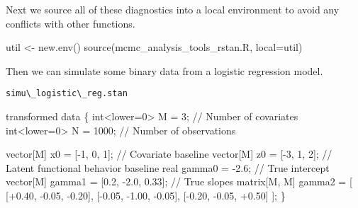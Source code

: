 \documentclass[
  letterpaper,
  DIV=11,
  numbers=noendperiod]{scrartcl}
\newenvironment{Shaded}{\begin{snugshade}}{\end{snugshade}}
\newcommand{\AttributeTok}[1]{\textcolor[rgb]{0.40,0.45,0.13}{#1}}
\newcommand{\CommentTok}[1]{\textcolor[rgb]{0.37,0.37,0.37}{#1}}
\newcommand{\DataTypeTok}[1]{\textcolor[rgb]{0.68,0.00,0.00}{#1}}
\newcommand{\DecValTok}[1]{\textcolor[rgb]{0.68,0.00,0.00}{#1}}
\newcommand{\FloatTok}[1]{\textcolor[rgb]{0.68,0.00,0.00}{#1}}
\newcommand{\FunctionTok}[1]{\textcolor[rgb]{0.28,0.35,0.67}{#1}}
\newcommand{\KeywordTok}[1]{\textcolor[rgb]{0.00,0.23,0.31}{#1}}
\newcommand{\NormalTok}[1]{\textcolor[rgb]{0.00,0.23,0.31}{#1}}
\newcommand{\OtherTok}[1]{\textcolor[rgb]{0.00,0.23,0.31}{#1}}
\newcommand{\StringTok}[1]{\textcolor[rgb]{0.13,0.47,0.30}{#1}}
\begin{document}
Next we source all of these diagnostics into a local environment to
avoid any conflicts with other functions.

\begin{Shaded}
\begin{Highlighting}[]
\NormalTok{util }\OtherTok{\textless{}{-}} \FunctionTok{new.env}\NormalTok{()}
\FunctionTok{source}\NormalTok{(}\StringTok{\textquotesingle{}mcmc\_analysis\_tools\_rstan.R\textquotesingle{}}\NormalTok{, }\AttributeTok{local=}\NormalTok{util)}
\end{Highlighting}
\end{Shaded}

Then we can simulate some binary data from a logistic regression model.

\begin{codelisting}

\caption{\texttt{simu\textbackslash\_logistic\textbackslash\_reg.stan}}

\begin{Shaded}
\begin{Highlighting}[]
\KeywordTok{transformed data}\NormalTok{ \{}
  \DataTypeTok{int}\NormalTok{\textless{}}\KeywordTok{lower}\NormalTok{=}\DecValTok{0}\NormalTok{\textgreater{} M = }\DecValTok{3}\NormalTok{;         }\CommentTok{// Number of covariates}
  \DataTypeTok{int}\NormalTok{\textless{}}\KeywordTok{lower}\NormalTok{=}\DecValTok{0}\NormalTok{\textgreater{} N = }\DecValTok{1000}\NormalTok{;      }\CommentTok{// Number of observations}
  
  \DataTypeTok{vector}\NormalTok{[M] x0 = [{-}}\DecValTok{1}\NormalTok{, }\DecValTok{0}\NormalTok{, }\DecValTok{1}\NormalTok{]\textquotesingle{}; }\CommentTok{// Covariate baseline}
  \DataTypeTok{vector}\NormalTok{[M] z0 = [{-}}\DecValTok{3}\NormalTok{, }\DecValTok{1}\NormalTok{, }\DecValTok{2}\NormalTok{]\textquotesingle{}; }\CommentTok{// Latent functional behavior baseline}
  \DataTypeTok{real}\NormalTok{ gamma0 = {-}}\FloatTok{2.6}\NormalTok{;                      }\CommentTok{// True intercept}
  \DataTypeTok{vector}\NormalTok{[M] gamma1 = [}\FloatTok{0.2}\NormalTok{, {-}}\FloatTok{2.0}\NormalTok{, }\FloatTok{0.33}\NormalTok{]\textquotesingle{};   }\CommentTok{// True slopes}
  \DataTypeTok{matrix}\NormalTok{[M, M] gamma2 = [ [+}\FloatTok{0.40}\NormalTok{, {-}}\FloatTok{0.05}\NormalTok{, {-}}\FloatTok{0.20}\NormalTok{],}
\NormalTok{                          [{-}}\FloatTok{0.05}\NormalTok{, {-}}\FloatTok{1.00}\NormalTok{, {-}}\FloatTok{0.05}\NormalTok{],}
\NormalTok{                          [{-}}\FloatTok{0.20}\NormalTok{, {-}}\FloatTok{0.05}\NormalTok{, +}\FloatTok{0.50}\NormalTok{] ];}
\NormalTok{\}}


\end{Highlighting}
\end{Shaded}
\end{codelisting}
\end{document}
